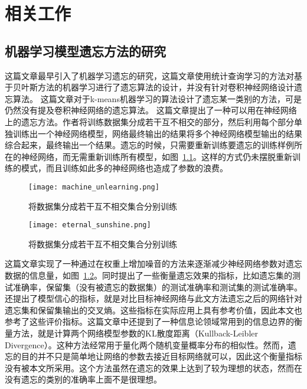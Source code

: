 
\chapter{相关工作}


\section{机器学习模型遗忘方法的研究}
这篇文章\cite{yinzhicao2015}最早引入了机器学习遗忘的研究，这篇文章使用统计查询学习的方法对基于贝叶斯方法的机器学习进行了遗忘算法的设计，并没有针对卷积神经网络设计遗忘算法。
这篇文章\cite{antonio2019}对于k-means机器学习的算法设计了遗忘某一类别的方法，可是仍然没有提及卷积神经网络的遗忘算法。
这篇文章\cite{2019arXiv191203817B}提出了一种可以用在神经网络上的遗忘方法。作者将训练数据集分成若干互不相交的部分，然后利用每个部分单独训练出一个神经网络模型，网络最终输出的结果将多个神经网络模型输出的结果综合起来，最终输出一个结果。遗忘的时候，只需要重新训练要遗忘的训练样例所在的神经网络，而无需重新训练所有模型，如图~\ref{fig:machine_unlearning}。这样的方式仍未摆脱重新训练的模式，而且训练如此多的神经网络也造成了参数的浪费。
\begin{figure}
    \centering
    \texttt{[image: machine\_unlearning.png]}
    \caption{将数据集分成若干互不相交集合分别训练}
    \label{fig:machine_unlearning}
\end{figure}
\begin{figure}
    \centering
    \texttt{[image: eternal\_sunshine.png]}
    \caption{将数据集分成若干互不相交集合分别训练}
    \label{fig:eternal_sunshine}
\end{figure}
这篇文章\cite{Golatkar_2020_CVPR}实现了一种通过在权重上增加噪音的方法来逐渐减少神经网络参数对遗忘数据的信息量，如图~\ref{fig:eternal_sunshine}。同时提出了一些衡量遗忘效果的指标，比如遗忘集的测试准确率，保留集（没有被遗忘的数据集）的测试准确率和测试集的测试准确率。还提出了模型信心的指标，就是对比目标神经网络与此文方法遗忘之后的网络针对遗忘集和保留集输出的交叉熵。这些指标在实际应用上具有参考价值，因此本文也参考了这些评价指标。这篇文章中还提到了一种信息论领域常用到的信息边界的衡量方法，就是计算两个网络模型参数的KL散度距离（Kullback-Leibler Divergence）。这种方法经常用于量化两个随机变量概率分布的相似性。然而，遗忘的目的并不只是简单地让网络的参数去接近目标网络就可以，因此这个衡量指标没有被本文所采用。这个方法虽然在遗忘的效果上达到了较为理想的状态，然而在没有遗忘的类别的准确率上面不是很理想。
